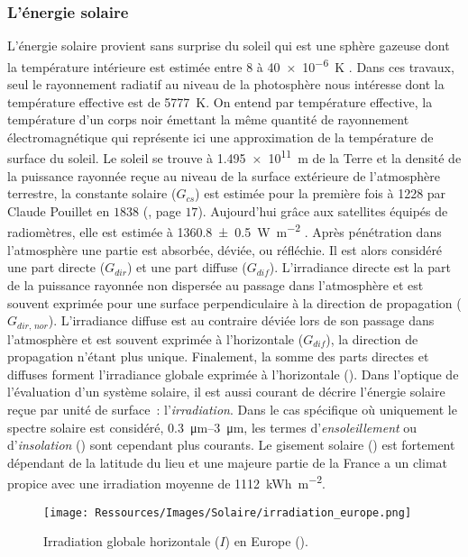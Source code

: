 \subsubsection{L’énergie solaire} %
\label{ssub:l_energie_solaire}
L’énergie solaire provient sans surprise du soleil qui est une sphère gazeuse dont la
température intérieure est estimée entre \num{8} à \SI{40e-6}{\kelvin}
\parencite{Duffie1980}. Dans ces travaux, seul le rayonnement radiatif au niveau de la
photosphère nous intéresse dont la température effective est de \SI{5777}{\kelvin}. On
entend par température effective, la température d’un corps noir émettant la même quantité
de rayonnement électromagnétique qui représente ici une approximation de la température de
surface du soleil. Le soleil se trouve à \SI{1.495e11}{\metre} de la Terre et la densité
de la puissance rayonnée reçue au niveau de la surface extérieure de l’atmosphère
terrestre, la constante solaire ($G_{cs}$) est estimée pour la première fois à \num{1228}
par Claude Pouillet en $1838$ (\cite{Coulson2012}, page $17$). Aujourd’hui grâce aux satellites équipés de radiomètres,
elle est estimée à \SI{1360.8 +- 0.5}{\watt\per\metre\squared} \parencite{Kopp2011}. Après
pénétration dans l’atmosphère une partie est absorbée, déviée, ou réfléchie. Il est alors
considéré une part directe ($G_{dir}$) et une part diffuse ($G_{dif}$). L’irradiance
directe est la part de la puissance rayonnée non dispersée au passage dans l’atmosphère et
est souvent exprimée pour une surface perpendiculaire à la direction de propagation
($G_{dir,\,nor}$). L’irradiance diffuse est au contraire déviée lors de son passage dans
l’atmosphère et est souvent exprimée à l’horizontale ($G_{dif}$), la direction de
propagation n’étant plus unique. Finalement, la somme des parts directes et diffuses
forment l’irradiance globale exprimée à l’horizontale (). Dans l’optique de
l’évaluation d’un système solaire, il est aussi courant de décrire l’énergie solaire reçue
par unité de surface~: l’\textit{irradiation}. Dans le cas spécifique où uniquement le spectre solaire est considéré,
\SIrange{0.3}{3}{\micro\metre}, les termes d’\textit{ensoleillement} ou d’\textit{insolation} () sont
cependant plus courants.
Le gisement solaire () est fortement dépendant de la latitude du lieu et une majeure partie
de la France a un climat propice avec une irradiation moyenne de \SI{1112}{kWh\per\metre\squared}.

\begin{figure}
    \centering
    \texttt{[image: Ressources/Images/Solaire/irradiation\_europe.png]}
    \caption[Irradiation globale horizontale en Europe]
            {Irradiation globale horizontale ($I$) en Europe ().}
    \label{fig:gisement_solaire}
\end{figure}


